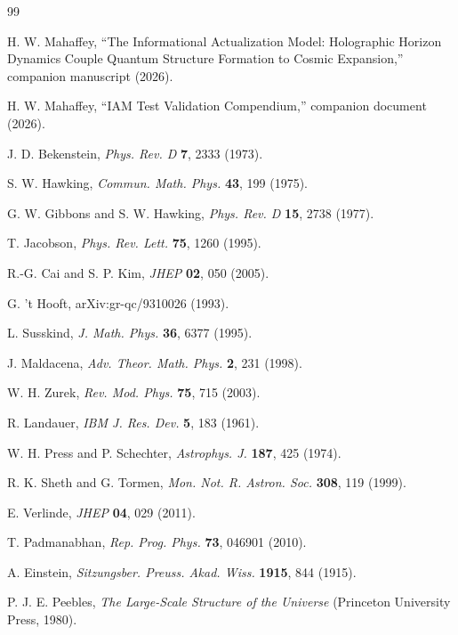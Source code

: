 \documentclass[twocolumn,superscriptaddress,prl,amsmath,amssymb]{revtex4-2}
\begin{document}
\begin{thebibliography}{99}

H. W. Mahaffey,
``The Informational Actualization Model: Holographic Horizon Dynamics Couple Quantum Structure Formation to Cosmic Expansion,''
companion manuscript (2026).

H. W. Mahaffey,
``IAM Test Validation Compendium,''
companion document (2026).

J. D. Bekenstein,
\textit{Phys. Rev. D} \textbf{7}, 2333 (1973).

S. W. Hawking,
\textit{Commun. Math. Phys.} \textbf{43}, 199 (1975).

G. W. Gibbons and S. W. Hawking,
\textit{Phys. Rev. D} \textbf{15}, 2738 (1977).

T. Jacobson,
\textit{Phys. Rev. Lett.} \textbf{75}, 1260 (1995).

R.-G. Cai and S. P. Kim,
\textit{JHEP} \textbf{02}, 050 (2005).

G. 't Hooft,
arXiv:gr-qc/9310026 (1993).

L. Susskind,
\textit{J. Math. Phys.} \textbf{36}, 6377 (1995).

J. Maldacena,
\textit{Adv. Theor. Math. Phys.} \textbf{2}, 231 (1998).

W. H. Zurek,
\textit{Rev. Mod. Phys.} \textbf{75}, 715 (2003).

R. Landauer,
\textit{IBM J. Res. Dev.} \textbf{5}, 183 (1961).

W. H. Press and P. Schechter,
\textit{Astrophys. J.} \textbf{187}, 425 (1974).

R. K. Sheth and G. Tormen,
\textit{Mon. Not. R. Astron. Soc.} \textbf{308}, 119 (1999).

E. Verlinde,
\textit{JHEP} \textbf{04}, 029 (2011).

T. Padmanabhan,
\textit{Rep. Prog. Phys.} \textbf{73}, 046901 (2010).

A. Einstein,
\textit{Sitzungsber. Preuss. Akad. Wiss.} \textbf{1915}, 844 (1915).

P. J. E. Peebles,
\textit{The Large-Scale Structure of the Universe}
(Princeton University Press, 1980).


\end{thebibliography}
\end{document}
